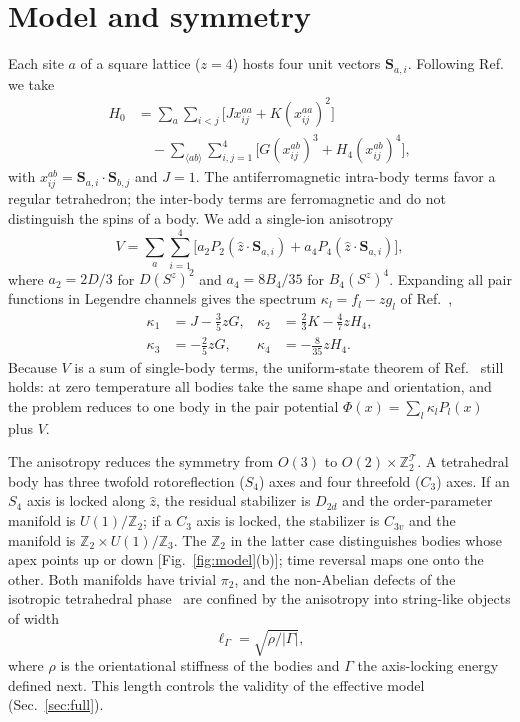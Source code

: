 \documentclass[pre,reprint,superscriptaddress,longbibliography,amsmath,amssymb,floatfix]{revtex4-2}
\newcommand{\Sv}{\mathbf{S}}
\begin{document}
\section{Model and symmetry}\label{sec:model}

Each site $a$ of a square lattice ($z=4$) hosts four unit vectors $\Sv_{a,i}$. Following Ref.~\cite{PaperI} we take
\begin{align}
H_0&=\sum_a\sum_{i<j}\big[Jx^{aa}_{ij}+K(x^{aa}_{ij})^2\big]\nonumber\\
&\quad-\sum_{\langle ab\rangle}\sum_{i,j=1}^{4}\big[G(x^{ab}_{ij})^3+H_4(x^{ab}_{ij})^4\big],
\label{eq:H0}
\end{align}
with $x^{ab}_{ij}=\Sv_{a,i}\cdot\Sv_{b,j}$ and $J=1$. The antiferromagnetic intra-body terms favor a regular tetrahedron; the inter-body terms are ferromagnetic and do not distinguish the spins of a body. We add a single-ion anisotropy
\begin{equation}
V=\sum_a\sum_{i=1}^4\big[a_2P_2(\hat z\cdot\Sv_{a,i})+a_4P_4(\hat z\cdot\Sv_{a,i})\big],
\label{eq:V}
\end{equation}
where $a_2=2D/3$ for $D(S^z)^2$ and $a_4=8B_4/35$ for $B_4(S^z)^4$. Expanding all pair functions in Legendre channels gives the spectrum $\kappa_l=f_l-zg_l$ of Ref.~\cite{PaperI},
\begin{align}
\kappa_1&=J-\tfrac35zG, & \kappa_2&=\tfrac23K-\tfrac47zH_4,\nonumber\\
\kappa_3&=-\tfrac25zG, & \kappa_4&=-\tfrac{8}{35}zH_4 .
\label{eq:kappa}
\end{align}
Because $V$ is a sum of single-body terms, the uniform-state theorem of Ref.~\cite{PaperI} still holds: at zero temperature all bodies take the same shape and orientation, and the problem reduces to one body in the pair potential $\Phi(x)=\sum_l\kappa_lP_l(x)$ plus $V$.

The anisotropy reduces the symmetry from $O(3)$ to $O(2)\times\mathbb Z_2^{\mathcal T}$. A tetrahedral body has three twofold rotoreflection ($S_4$) axes and four threefold ($C_3$) axes. If an $S_4$ axis is locked along $\hat z$, the residual stabilizer is $D_{2d}$ and the order-parameter manifold is $U(1)/\mathbb Z_2$; if a $C_3$ axis is locked, the stabilizer is $C_{3v}$ and the manifold is $\mathbb Z_2\times U(1)/\mathbb Z_3$. The $\mathbb Z_2$ in the latter case distinguishes bodies whose apex points up or down [Fig.~\ref{fig:model}(b)]; time reversal maps one onto the other. Both manifolds have trivial $\pi_2$, and the non-Abelian defects of the isotropic tetrahedral phase~\cite{PaperI,Mermin1979} are confined by the anisotropy into string-like objects of width
\begin{equation}
\ell_\Gamma=\sqrt{\rho/|\Gamma|},
\label{eq:lGamma}
\end{equation}
where $\rho$ is the orientational stiffness of the bodies and $\Gamma$ the axis-locking energy defined next. This length controls the validity of the effective model (Sec.~\ref{sec:full}).
\end{document}
